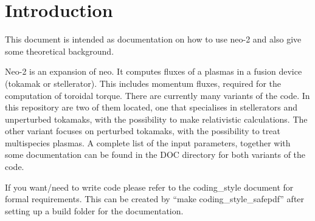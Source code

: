 \chapter{Introduction}
This document is intended as documentation on how to use neo-2 and also
give some theoretical background.

Neo-2 is an expansion of neo. It computes fluxes of a plasmas in a
fusion device (tokamak or stellerator). This includes momentum fluxes,
required for the computation of toroidal torque.
There are currently many variants of the code. In this repository are
two of them located,  one that specialises in stellerators and
unperturbed tokamaks, with the possibility to make relativistic
calculations.
The other variant focuses on perturbed tokamaks, with the possibility to
treat multispecies plasmas.
A complete list of the input parameters, together with some
documentation can be found in the DOC directory for both variants of the
code.

If you want/need to write code please refer to the coding\_style
document for formal requirements.
This can be created by ``make coding\_style\_safepdf'' after setting up a
build folder for the documentation.
